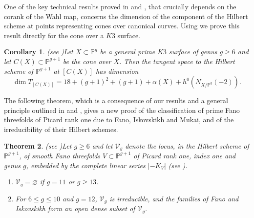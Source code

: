 \documentclass[11pt,twoside]{amsart}
\theoremstyle{plain}
\newtheorem{theorem}{Theorem}[section]
\newtheorem{corollary}[theorem]{Corollary}
\theoremstyle{definition}
\begin{document}
\smallskip

One of the key technical results proved in \cite{CLM93} and \cite{CLM98}, that crucially depends on the corank of the Wahl map, concerns the dimension of the component of the Hilbert scheme at points representing cones over canonical curves. Using  we prove this result directly for the cone over a $K3$ surface.

\begin{corollary}(see )\label{cor:cone intro}
Let $X \subset \mathbb{P}^g$ be a general prime $K3$ surface of genus $g \geq 6$ and let $C(X) \subset \mathbb{P}^{g+1}$ be the cone over $X$. Then the tangent space to the Hilbert scheme of $\mathbb{P}^{g+1}$ at $[C(X)]$ has dimension
\[
\dim T_{[C(X)]} = 18+(g+1)^2+(g+1)+\alpha(X)+h^0(N_{X/\mathbb{P}^g}(-2)).
\]
\end{corollary}

The following theorem, which is a consequence of our results and a general principle outlined in \cite{CLM93} and \cite{CLM98}, gives a new proof of the classification of prime Fano threefolds of Picard rank one due to Fano, Iskovskikh and Mukai, and of the irreducibility of their Hilbert schemes.

\begin{theorem}(see )\label{thm:fano intro}
Let $g \geq 6$ and let $\mathcal{V}_g$ denote the locus, in the Hilbert scheme of $\mathbb{P}^{g+1}$, of smooth Fano threefolds $V \subset \mathbb{P}^{g+1}$ of Picard rank one, index one and genus $g$, embedded by the complete linear series $|-K_V|$ (see ).
\begin{enumerate}
    \item $\mathcal{V}_g = \varnothing$ if $g = 11$ or $g \geq 13$.
    \item For $6 \leq g \leq 10$ and $g = 12$, $\mathcal{V}_g$ is irreducible, and the families of Fano and Iskovskikh form an open dense subset of $\mathcal{V}_g$.
\end{enumerate}
\end{theorem}

\end{document}
